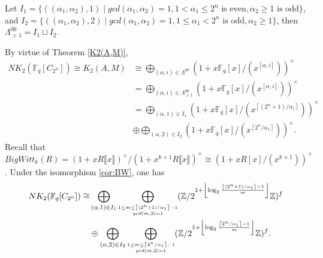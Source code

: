 \begin{lemma}
Let $I_1 =\{((\alpha_1,\alpha_2),1)\mid gcd(\alpha_1,\alpha_2)=1, 1< \alpha_1\leq 2^n\text{ is even}, \alpha_2\geq 1\text{ is odd}\}$, and $I_2=\{((\alpha_1,\alpha_2),2)\mid gcd(\alpha_1,\alpha_2)=1, 1\leq \alpha_1<2^n\text{ is odd}, \alpha_2\geq 1\}$, then $\Lambda^{00}_{>1}=I_1\sqcup I_2$. 
\end{lemma}
By virtue of Theorem \ref{K2(A,M)}, 
\begin{align*}
NK_2(\mathbb{F}_q[C_{2^n}])\cong K_2(A,M) &\cong \bigoplus_{(\alpha,i)\in\Lambda^{00}}(1+x\mathbb{F}_q[x]/(x^{[\alpha,i]}))^{\times}\\
& = \bigoplus_{(\alpha,i)\in \Lambda^{00}_{>1}}(1+x\mathbb{F}_q[x]/(x^{[\alpha,i]}))^{\times}\\
& = \bigoplus_{(\alpha,1)\in I_1}(1+x\mathbb{F}_q[x]/(x^{\left \lceil (2^n+1)/\alpha_1 \right \rceil}))^{\times} \\
& \oplus \bigoplus_{(\alpha,2)\in I_2}(1+x\mathbb{F}_q[x]/(x^{\left \lceil 2^n/\alpha_1 \right \rceil}))^{\times}.
\end{align*}
Recall that $BigWitt_{k}(R)=(1+x R\llbracket x\rrbracket )^{\times}/(1+x^{k+1} R\llbracket x\rrbracket )^{\times} \cong (1+x R[x]/(x^{k+1}))^{\times}$. 
Under the isomorphism \ref{cor:BW}, one has 
\begin{align*}
NK_2(\mathbb{F}_q[C_{2^n}])\cong & \bigoplus_{(\alpha,1)\in I_1}\bigoplus_{\scriptsize\substack{1\leq m\leq \left \lceil (2^n+1)/\alpha_1 \right \rceil-1 \\ gcd(m,2)=1}}(\mathbb{Z}/2^{1+ \left \lfloor\log_2 \frac{\left \lceil (2^n+1)/\alpha_1 \right \rceil-1}{m}  \right \rfloor}\mathbb{Z})^f \\
& \oplus \bigoplus_{(\alpha,2)\in I_2}\bigoplus_{\scriptsize\substack{ 1 \leq m\leq \left \lceil 2^n/\alpha_1 \right \rceil-1 \\ gcd(m,2)=1}}(\mathbb{Z}/2^{1+ \left \lfloor\log_2 \frac{\left \lceil 2^n/\alpha_1 \right \rceil-1}{m}  \right \rfloor}\mathbb{Z})^f.
\end{align*}

